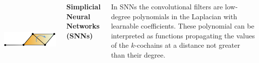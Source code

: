 \documentclass[landscape,a0paper]{tikzposter}
\begin{document}
\begin{columns}
{{\begin{center}
\begin{minipage}{0.2\linewidth}
\begin{center}
          \vspace{1cm}
        
          \end{center}
      \end{minipage} \hspace{3.5cm}
	\begin{minipage}{0.2\linewidth}
	\begin{center}
          \includegraphics[height=4cm]{figures/glap2.png}
          
        
          \end{center}
      \end{minipage} 
      \end{center}



 \begin{center} 
\Large{\textbf{Simplicial Neural Networks (SNNs)}}
\end{center}
\vspace{0.3cm}
In SNNs the convolutional filters are low-degree polynomials in the Laplacian with learnable coefficients.
These polynomial can be interpreted as functions propagating the values of the $k$-cochains at a distance not greater than their degree.


\vspace{0.3cm}

}}
\end{columns}
\end{document}
